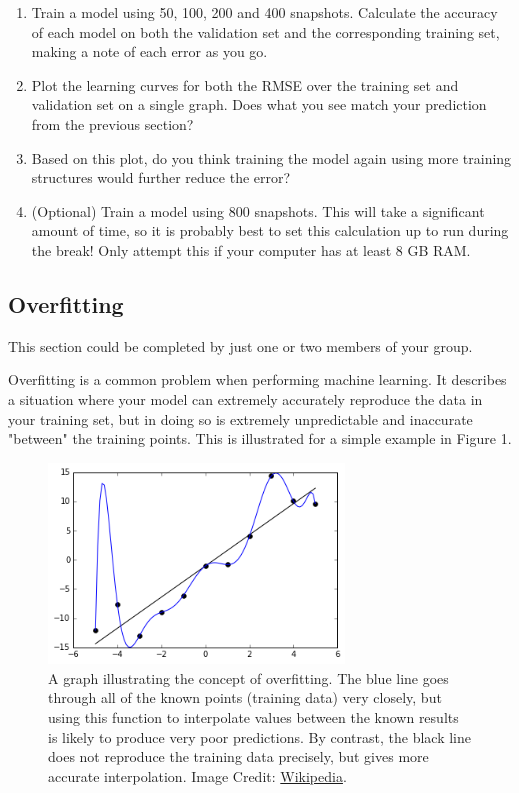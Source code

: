\documentclass{article}
\begin{document}
\begin{enumerate}

\item Train a model using 50, 100, 200 and 400 snapshots. Calculate the accuracy of each model on both the validation set and the corresponding training set, making a note of each error as you go.
\item Plot the learning curves for both the RMSE over the training set and validation set on a single graph. Does what you see match your prediction from the previous section?
\item Based on this plot, do you think training the model again using more training structures would further reduce the error?
\item (Optional) Train a model using 800 snapshots. This will take a significant amount of time, so it is probably best to set this calculation up to run during the break! Only attempt this if your computer has at least 8 GB RAM.

\end{enumerate}

\subsection{Overfitting}

This section could be completed by just one or two members of your group.

Overfitting is a common problem when performing machine learning. It describes a situation where your model can extremely accurately reproduce the data in your training set, but in doing so is extremely unpredictable and inaccurate "between" the training points. This is illustrated for a simple example in Figure 1.

\begin{figure}[t]

\centering

\includegraphics[width=0.7\textwidth]{Overfitted_Data.png}
\caption{A graph illustrating the concept of overfitting. The blue line goes through all of the known points (training data) very closely, but using this function to interpolate values between the known results is likely to produce very poor predictions. By contrast, the black line does not reproduce the training data precisely, but gives more accurate interpolation. Image Credit: \href{https://en.wikipedia.org/wiki/Overfitting}{Wikipedia}.}

\end{figure}
\end{document}
